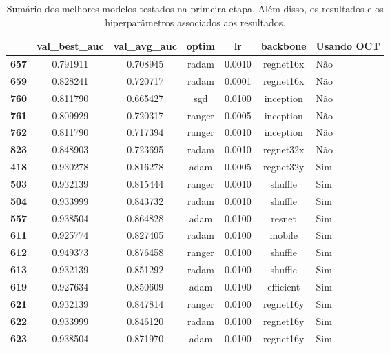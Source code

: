 \begin{table}
\centering
\caption{Sumário dos melhores modelos testados na primeira etapa. Além disso, os resultados e os hiperparâmetros associados aos resultados.}
\label{tab:aucdboct}
\begin{tabular}{c|c|c|c|c|c|}
\toprule
{} &  val\_best\_auc &  val\_avg\_auc &   optim &      lr &   backbone & Usando OCT \\
\midrule
\textbf{657} &      0.791911 &     0.708945 &   radam &  0.0010 &  regnet16x &        Não \\
\textbf{659} &      0.828241 &     0.720717 &   radam &  0.0001 &  regnet16x &        Não \\
\textbf{760} &      0.811790 &     0.665427 &     sgd &  0.0100 &  inception &        Não \\
\textbf{761} &      0.809929 &     0.720317 &  ranger &  0.0005 &  inception &        Não \\
\textbf{762} &      0.811790 &     0.717394 &  ranger &  0.0010 &  inception &        Não \\
\textbf{823} &      0.848903 &     0.723695 &   radam &  0.0010 &  regnet32x &        Não \\
\textbf{418} &      0.930278 &     0.816278 &    adam &  0.0005 &  regnet32y &        Sim \\
\textbf{503} &      0.932139 &     0.815444 &  ranger &  0.0010 &    shuffle &        Sim \\
\textbf{504} &      0.933999 &     0.843732 &   radam &  0.0010 &    shuffle &        Sim \\
\textbf{557} &      0.938504 &     0.864828 &    adam &  0.0100 &     resnet &        Sim \\
\textbf{611} &      0.925774 &     0.827405 &   radam &  0.0100 &     mobile &        Sim \\
\textbf{612} &      0.949373 &     0.876458 &  ranger &  0.0100 &    shuffle &        Sim \\
\textbf{613} &      0.932139 &     0.851292 &   radam &  0.0100 &    shuffle &        Sim \\
\textbf{619} &      0.927634 &     0.850609 &    adam &  0.0100 &  efficient &        Sim \\
\textbf{621} &      0.932139 &     0.847814 &  ranger &  0.0100 &  regnet16y &        Sim \\
\textbf{622} &      0.933999 &     0.846120 &   radam &  0.0100 &  regnet16y &        Sim \\
\textbf{623} &      0.938504 &     0.871970 &    adam &  0.0100 &  regnet16y &        Sim \\

\end{tabular}
\end{table}
